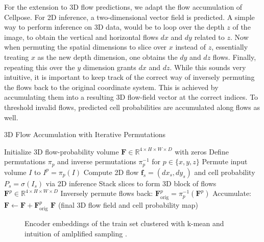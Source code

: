 For the extension to 3D flow predictions, we adapt the flow accumulation of Cellpose. For 2D inference, a two-dimensional vector field is predicted. A simple way to perform inference on 3D data, would be to loop over the depth $z$ of the image, to obtain the vertical and horizontal flows $dx$ and $dy$ related to $z$. Now when permuting the spatial dimensions to slice over $x$ instead of $z$, essentially treating $x$ as the new depth dimension, one obtains the $dy$ and $dz$ flows. Finally, repeating this over the $y$ dimension grants $dx$ and $dz$. While this sounds very intuitive, it is important to keep track of the correct way of inversely permuting the flows back to the original coordinate system. This is achieved by accumulating them into a resulting 3D flow-field vector at the correct indices. To threshold invalid flows, predicted cell probabilities are accumulated along flows as well.

\begin{algorithm}
\caption{3D Flow Accumulation with Iterative Permutations}
\label{algo:3dflows}
\begin{algorithmic}[1]
\STATE Initialize 3D flow-probability volume $\mathbf{F} \in \mathbb{R}^{4 \times H \times W \times D}$ with zeros
\STATE Define permutations $\pi_p$ and inverse permutations $\pi_p^{-1}$ for $p \in \{x,y,z\}$
    \STATE Permute input volume $I$ to $I^p = \pi_p(I)$
        \STATE Compute 2D flow $\mathbf{f}_s = (dx_s, dy_s)$ and cell probability $P_s = \sigma(I_s)$ via 2D inference
    \ENDFOR
    \STATE Stack slices to form 3D block of flows $\mathbf{F}^p \in \mathbb{R}^{4 \times H \times W \times D}$
    \STATE Inversely permute flows back: $\mathbf{F}^{p}_{\text{orig}} = \pi_p^{-1}(\mathbf{F}^p)$
    \STATE Accumulate: $\mathbf{F} \gets \mathbf{F} + \mathbf{F}^{p}_{\text{orig}}$
\ENDFOR
\RETURN $\mathbf{F}$ (final 3D flow field and cell probability map)
\end{algorithmic}
\end{algorithm}
\begin{figure}[!ht]
    \centering
    \caption{Encoder embeddings of the train set clustered with k-mean and intuition of amlplified sampling \cite{LeCun.1989}.}
    \label{fig:slicing}
\end{figure}

